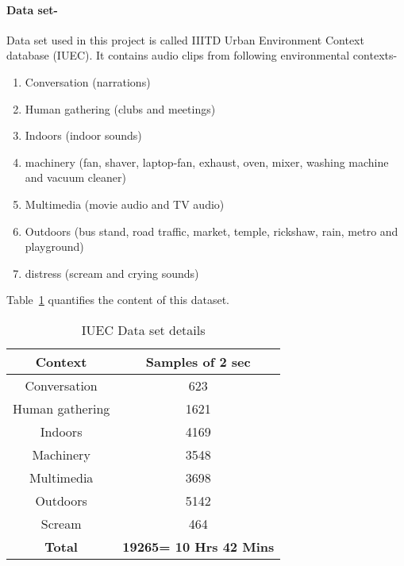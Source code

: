 \paragraph{Data set-\\}

Data set used in this project is called IIITD Urban Environment Context database (IUEC)\cite{paper10}. It contains audio clips from following environmental contexts-
\begin{enumerate}
\item Conversation (narrations)
\item Human gathering (clubs and meetings)
\item Indoors (indoor sounds)
\item machinery (fan, shaver, laptop-fan, exhaust, oven, mixer, washing machine and vacuum cleaner)
\item Multimedia (movie audio and TV audio)
\item Outdoors (bus stand, road traffic, market, temple, rickshaw, rain, metro and playground)
\item distress (scream and crying sounds)
\end{enumerate}

Table~\ref{tab:quandata} quantifies the content of this dataset.
\begin{table}[H]
\begin{center}
\begin{tabular}{ |c|c| } 
 \hline
 \textbf{Context} & \textbf{Samples of 2 sec} \\ 
 \hline
 \hline
 Conversation & 623 \\
 \hline 
 Human gathering & 1621 \\ 
 \hline
 Indoors & 4169 \\
 \hline
 Machinery & 3548 \\
 \hline
 Multimedia & 3698 \\
 \hline
 Outdoors & 5142 \\
 \hline
 Scream & 464 \\
 \hline
 \hline
 \textbf{Total} & \textbf{19265= 10 Hrs 42 Mins}\\
 \hline
\end{tabular}
\end{center}
\caption{IUEC Data set details} \label{tab:quandata}
\end{table}

